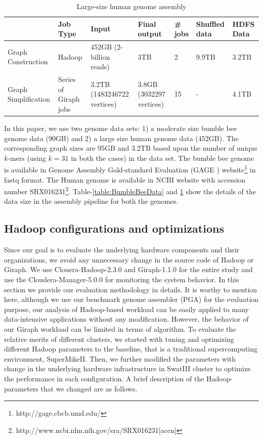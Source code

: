 \documentclass[conference]{IEEEtran}
\begin{document}
\begin{table}
\begin{center}
    \begin{tabular}{ |p{1.1cm} | p{0.8cm} | p{1.1cm} | p{0.8cm} | p{0.8cm} | p{0.8cm} | p{0.8cm}|} \hline
    & Job Type & Input & Final output & \# jobs & Shuffled data & HDFS Data \\ \hline
    Graph Construction & Hadoop & 452GB (2-billion reads) & 3TB & 2 & 9.9TB & 3.2TB \\ \hline
    Graph Simplification & Series of Giraph jobs & 3.2TB (1483246722 vertices) & 3.8GB (3032297 vertices) & 15 & - & 4.1TB \\ \hline    
    \end{tabular}
    \caption{Large-size human genome assembly}
	\label{table:HumanData}
\end{center}
\vspace{-3.0em}
\end{table}
In this paper, we use two genome data sets: 1) a moderate size bumble bee genome data (90GB) and 2) a large size human genome data (452GB). The corresponding graph sizes are 95GB and 3.2TB based upon the number of unique $k$-mers (using $k=31$ in both the cases) in the data set. The bumble bee genome is available in Genome Assembly Gold-standard Evaluation (GAGE \cite{bio:gage}) website\footnote{http://gage.cbcb.umd.edu/} in fastq format. The Human genome is available in NCBI website with accession number SRX016231\footnote{http://www.ncbi.nlm.nih.gov/sra/SRX016231[accn]}. Table-\ref{table:BumbleBeeData} and \ref{table:HumanData} show the details of the data size in the assembly pipeline for both the genomes. 

\subsection {Hadoop configurations and optimizations} \label{HadoopConfigurationsAndoptimizations}
Since our goal is to evaluate the underlying hardware components and their organizations, we avoid any unnecessary change in the source code of Hadoop or Giraph. We use Clouera-Hadoop-2.3.0 and Giraph-1.1.0 for the entire study and use the Cloudera-Manager-5.0.0 for monitoring the system behavior. In this section we provide our evaluation methodology in details. It is worthy to mention here, although we use our benchmark genome assembler (PGA) for the evaluation purpose, our analysis of Hadoop-based workload can be easily applied to many data-intensive applications without any modification. However, the behavior of our Giraph workload can be limited in terms of algorithm. To evaluate the relative merits of different clusters, we started with tuning and optimizing different Hadoop parameters to the baseline, that is a traditional supercomputing environment, SuperMikeII. Then, we further modified the parameters with change in the underlying hardware infrastructure in SwatIII cluster to optimize the performance in each configuration. A brief description of the Hadoop-parameters that we changed are as follows.
  
\end{document}
